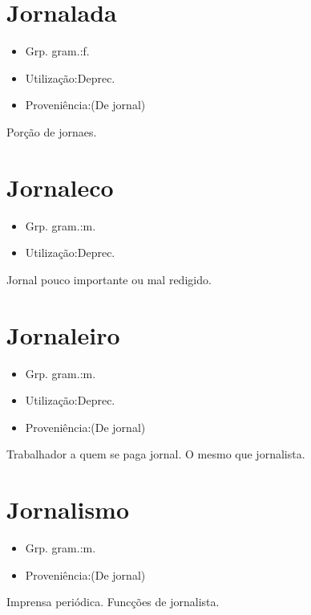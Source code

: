 \documentclass{article}
\begin{document}
\section{Jornalada}
\begin{itemize}
\item {Grp. gram.:f.}
\end{itemize}
\begin{itemize}
\item {Utilização:Deprec.}
\end{itemize}
\begin{itemize}
\item {Proveniência:(De \textunderscore jornal\textunderscore )}
\end{itemize}
Porção de jornaes.
\section{Jornaleco}
\begin{itemize}
\item {Grp. gram.:m.}
\end{itemize}
\begin{itemize}
\item {Utilização:Deprec.}
\end{itemize}
Jornal pouco importante ou mal redigido.
\section{Jornaleiro}
\begin{itemize}
\item {Grp. gram.:m.}
\end{itemize}
\begin{itemize}
\item {Utilização:Deprec.}
\end{itemize}
\begin{itemize}
\item {Proveniência:(De \textunderscore jornal\textunderscore )}
\end{itemize}
Trabalhador a quem se paga jornal.
O mesmo que \textunderscore jornalista\textunderscore .
\section{Jornalismo}
\begin{itemize}
\item {Grp. gram.:m.}
\end{itemize}
\begin{itemize}
\item {Proveniência:(De \textunderscore jornal\textunderscore )}
\end{itemize}
Imprensa periódica.
Funcções de jornalista.
\end{document}
